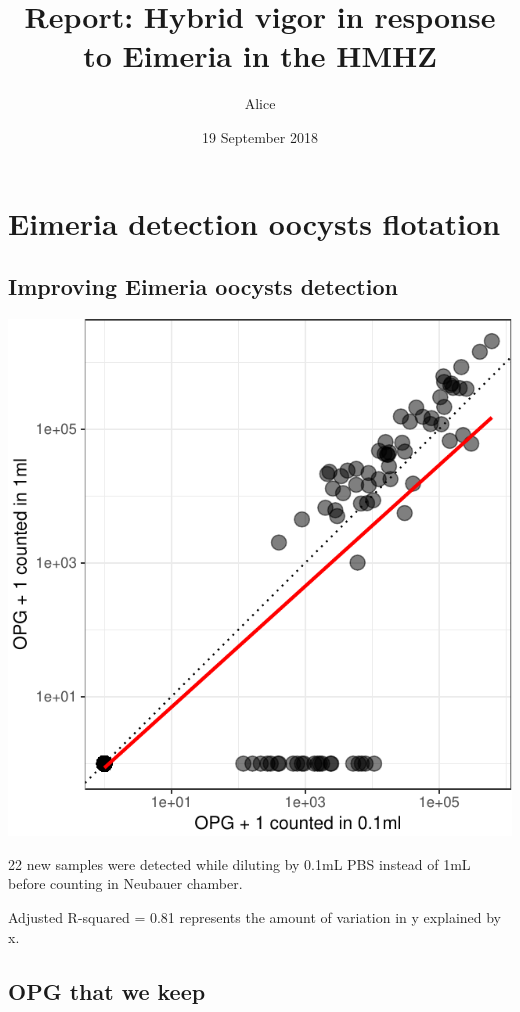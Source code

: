 \documentclass[]{article}
\title{Report: Hybrid vigor in response to Eimeria in the HMHZ}
\author{Alice}
\date{19 September 2018}
\begin{document}
\maketitle

{
\setcounter{tocdepth}{4}
\tableofcontents
}
\section{Eimeria detection oocysts
flotation}\label{eimeria-detection-oocysts-flotation}

\subsection{Improving Eimeria oocysts
detection}\label{improving-eimeria-oocysts-detection}

\includegraphics{Data_Analysis_Alice_files/figure-latex/oocystsDetec-1.pdf}

22 new samples were detected while diluting by 0.1mL PBS instead of 1mL
before counting in Neubauer chamber.

Adjusted R-squared = 0.81 represents the amount of variation in y
explained by x.

\subsection{OPG that we keep}\label{opg-that-we-keep}
\end{document}
